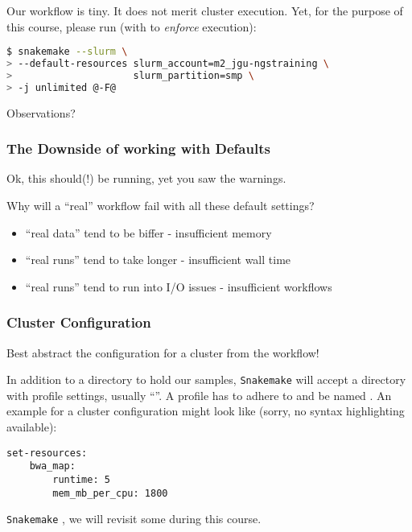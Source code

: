 \begin{frame}[fragile]
  \frametitle{}
  Our workflow is {\tiny tiny}. It does not merit cluster execution. Yet, for the purpose of this course, please run (with  to \emph{enforce} execution):
  \begin{lstlisting}[language=Bash, style=Shell, basicstyle=\footnotesize]
$ snakemake --slurm \
> --default-resources slurm_account=m2_jgu-ngstraining \
>                     slurm_partition=smp \
> -j unlimited @-F@
  \end{lstlisting}
  \begin{question}
  	Observations?
  \end{question}
\end{frame}

\begin{frame}
  \frametitle{The Downside of working with Defaults}
  Ok, this should(!) be running, yet you saw the warnings. 
  \begin{question}
  	Why will a ``real'' workflow fail with all these default settings?
  \end{question}
  \pause
  \begin{itemize}
   \item ``real data'' tend to be biffer - insufficient memory
   \item ``real runs'' tend to take longer - insufficient wall time
   \item ``real runs'' tend to run into I/O issues - insufficient workflows
  \end{itemize}
\end{frame}


\begin{frame}[fragile]
  \frametitle{Cluster Configuration}
  \begin{hint}
  	Best abstract the configuration for a cluster from the workflow!
  \end{hint}
  In addition to a  directory to hold our samples, \texttt{Snakemake} will accept a directory with profile settings, usually ``''.
  \pause
  A profile has to adhere to  and be named . An example for a cluster configuration might look like (sorry, no syntax highlighting available):
  \begin{lstlisting}[style=Plain]
set-resources:
    bwa_map:
        runtime: 5
        mem_mb_per_cpu: 1800
  \end{lstlisting}
  \pause
  
  \texttt{Snakemake} , we will revisit some during this course.

\end{frame}

